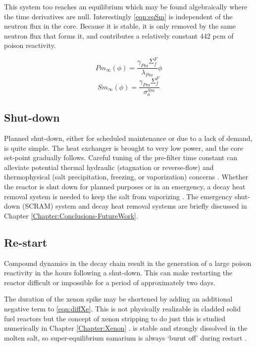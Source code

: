 This system too reaches an equilibrium which may be found algebraically where the time derivatives are null. Interestingly \ref{eqn:eqSm} is independent of the neutron flux in the core. Because it is stable, it is only removed by the same neutron flux that forms it, and contributes a relatively constant 442 pcm of poison reactivity. 

\begin{equation}\label{eqn:eqPm}
    Pm_{\infty}(\phi) = \frac{\gamma_{Pm} \Sigma_f^F }{\lambda_{Pm}}\phi
\end{equation}
\begin{equation}\label{eqn:eqSm}
    Sm_{\infty}(\phi) = \frac{\gamma_{Pm} \Sigma_f^F }{\sigma_a^{Sm}}
\end{equation}

\subsection{Shut-down}
Planned shut-down, either for scheduled maintenance or due to a lack of demand, is quite simple. The heat exchanger is brought to very low power, and the core set-point gradually follows. Careful tuning of the pre-filter time constant can alleviate potential thermal hydraulic (\eg stagnation or reverse-flow) and thermophysical (\eg salt precipitation, freezing, or vaporization) concerns \cite{CarterNumerical}. Whether the reactor is shut down for planned purposes or in an emergency, a decay heat removal system is needed to keep the salt from vaporizing \cite{TodreasKazimi1}. The emergency shut-down (SCRAM) system and decay heat removal systems are briefly discussed in Chapter \ref{Chapter:Conclusions-FutureWork}.  

\subsection{Re-start}
Compound dynamics in the \Xe decay chain result in the generation of a large poison reactivity in the hours following a shut-down. This can make restarting the reactor difficult or impossible for a period of approximately two days. 

The duration of the xenon spike may be shortened by adding an additional negative term to \ref{eqn:diffXe}. This is not physically realizable in cladded solid fuel reactors but the concept of xenon stripping to do just this is studied numerically in Chapter \ref{Chapter:Xenon} \cite{RootXe}. \Sm is stable and strongly dissolved in the molten salt, so super-equilibrium samarium is always `burnt off' during restart \cite[Ch. 7]{Lamarsh}.